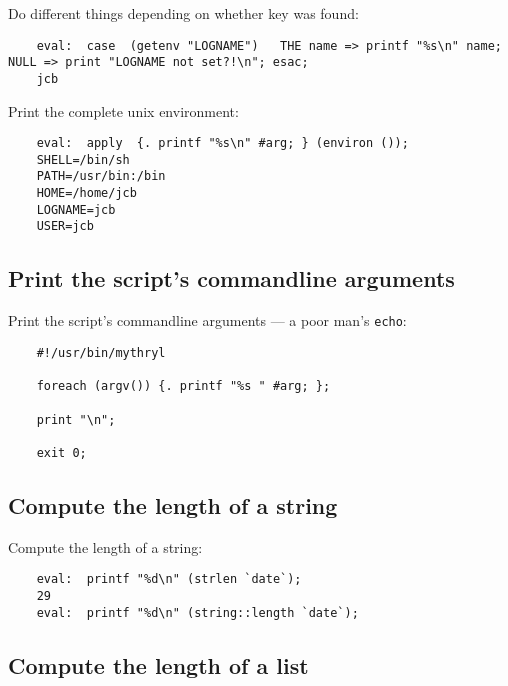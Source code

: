 Do different things depending on whether 
key was found:
\begin{verbatim}
    eval:  case  (getenv "LOGNAME")   THE name => printf "%s\n" name; NULL => print "LOGNAME not set?!\n"; esac;
    jcb
\end{verbatim}

Print the complete unix environment:
\begin{verbatim}
    eval:  apply  {. printf "%s\n" #arg; } (environ ());
    SHELL=/bin/sh
    PATH=/usr/bin:/bin
    HOME=/home/jcb
    LOGNAME=jcb
    USER=jcb
\end{verbatim}

\cutend*

\subsection{Print the script's commandline arguments}

Print the script's commandline arguments 
--- a poor man's {\tt echo}:
\begin{verbatim}
    #!/usr/bin/mythryl

    foreach (argv()) {. printf "%s " #arg; };

    print "\n";

    exit 0;
\end{verbatim}

\cutend*

\subsection{Compute the length of a string}

Compute the length of a string:
\begin{verbatim}
    eval:  printf "%d\n" (strlen `date`);
    29
    eval:  printf "%d\n" (string::length `date`);
\end{verbatim}

\cutend*

\subsection{Compute the length of a list}

